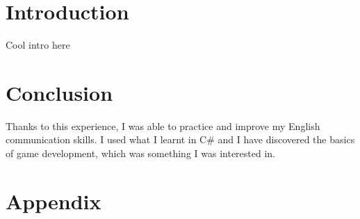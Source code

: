 \documentclass[a4paper]{article} %
\begin{document}
\section{Introduction}
Cool intro here~\cite{wikiVR}
\newpage
\section{Conclusion}
Thanks to this experience, I was able to practice and improve my English communication skills. I used what I learnt in C\# and I have discovered the basics of game development, which was something I was interested in.\smallbreak
\newpage


\newpage
\section*{Appendix}
\end{document}
